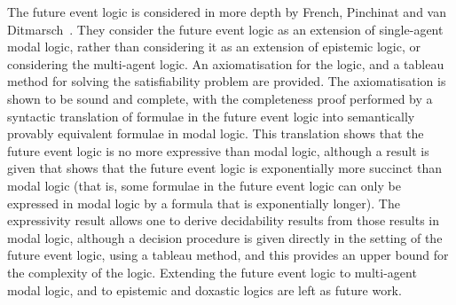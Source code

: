The future event logic is considered in more depth by French, Pinchinat and van
Ditmarsch~\cite{french2010future}. They consider the future event logic as an
extension of single-agent modal logic, rather than considering it as an
extension of epistemic logic, or considering the multi-agent logic.  An
axiomatisation for the logic, and a tableau method for solving the
satisfiability problem are provided. The axiomatisation is shown to be sound and
complete, with the completeness proof performed by a syntactic translation of
formulae in the future event logic into semantically provably equivalent
formulae in modal logic. This translation shows that the future event logic is
no more expressive than modal logic, although a result is given that shows that
the future event logic is exponentially more succinct than modal logic (that is,
some formulae in the future event logic can only be expressed in modal logic by
a formula that is exponentially longer). The expressivity result allows one to
derive decidability results from those results in modal logic, although a
decision procedure is given directly in the setting of the future event logic,
using a tableau method, and this provides an upper bound for the complexity of
the logic. Extending the future event logic to multi-agent modal logic, and to
epistemic and doxastic logics are left as future work.
